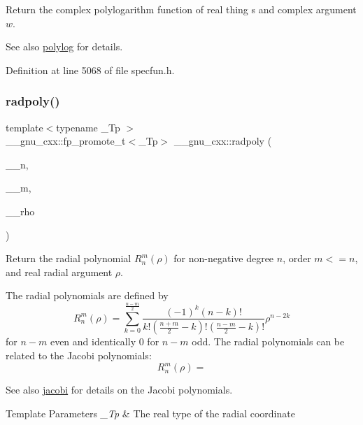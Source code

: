 Return the complex polylogarithm function of real thing {\ttfamily s} and complex argument $ w $.

\begin{DoxySeeAlso}{See also}
\hyperlink{group__gnu__math__spec__func_gabcc5480ad739561c2debd6a8a352084f}{polylog} for details. 
\end{DoxySeeAlso}


Definition at line 5068 of file specfun.\+h.

\mbox{\label{group__gnu__math__spec__func_ga195db2592888b7a8df870d9eaeff8d05}} 
\subsubsection{\texorpdfstring{radpoly()}{radpoly()}}
{\footnotesize\ttfamily template$<$typename \+\_\+\+Tp $>$ \\
\+\_\+\+\_\+gnu\+\_\+cxx\+::fp\+\_\+promote\+\_\+t$<$\+\_\+\+Tp$>$ \+\_\+\+\_\+gnu\+\_\+cxx\+::radpoly (\begin{DoxyParamCaption}\item[{unsigned int}]{\+\_\+\+\_\+n,  }\item[{unsigned int}]{\+\_\+\+\_\+m,  }\item[{\+\_\+\+Tp}]{\+\_\+\+\_\+rho }\end{DoxyParamCaption})\hspace{0.3cm}{\ttfamily [inline]}}

Return the radial polynomial $ R_n^m(\rho) $ for non-\/negative degree $ n $, order $ m <= n $, and real radial argument $ \rho $.

The radial polynomials are defined by \[ R_n^m(\rho) = \sum_{k=0}^{\frac{n-m}{2}} \frac{(-1)^k(n-k)!}{k!(\frac{n+m}{2}-k)!(\frac{n-m}{2}-k)!} \rho^{n-2k} \] for $ n - m $ even and identically 0 for $ n - m $ odd. The radial polynomials can be related to the Jacobi polynomials\+: \[ R_n^m(\rho) = \] \begin{DoxySeeAlso}{See also}
\hyperlink{group__gnu__math__spec__func_gad54f6601748324d268532138eb38ca33}{jacobi} for details on the Jacobi polynomials.
\end{DoxySeeAlso}

\begin{DoxyTemplParams}{Template Parameters}
{\em \+\_\+\+Tp} & The real type of the radial coordinate \\
\hline
\end{DoxyTemplParams}

